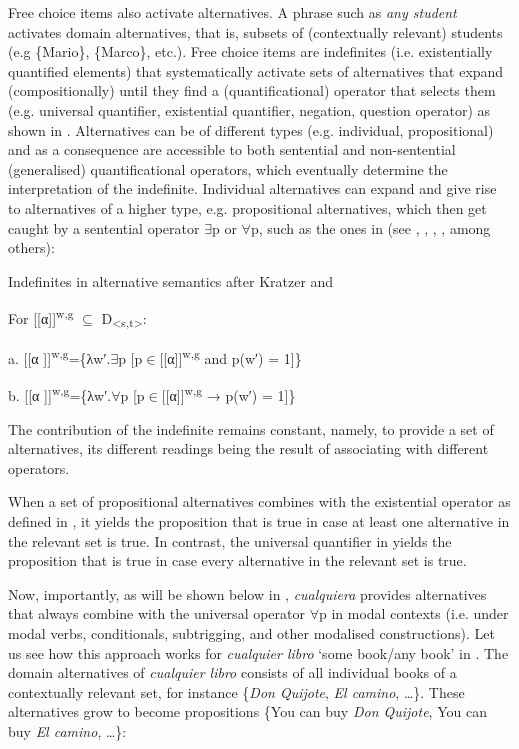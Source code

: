 \documentclass[output=paper]{langscibook}
\begin{document}
  Free choice items also activate alternatives. A phrase such as \textit{any student} activates domain alternatives, that is, subsets of (contextually relevant) students (e.g \{Mario\}, \{Marco\}, etc.). Free choice items are indefinites (i.e. existentially quantified elements) that systematically activate sets of alternatives that expand (compositionally) until they find a (quantificational) operator that selects them (e.g. universal quantifier, existential quantifier, negation, question operator) as shown in . Alternatives can be of different types (e.g. individual, propositional) and as a consequence are accessible to both sentential and non-sentential (generalised) quantificational operators, which eventually determine the interpretation of the indefinite. Individual alternatives can expand and give rise to alternatives of a higher type, e.g. propositional alternatives, which then get caught by a sentential operator ${\exists}$p or ${\forall}$p, such as the ones in  (see \citealt{KratzerShimoyama2002}, \citealt{Chierchia2006}, \citealt{Aloni2007}, \citealt{Alonso-OvalleMenéndez-Benito2011}, among others):

\label{bkm:Ref533761448}  Indefinites in alternative semantics after Kratzer and \citet[8]{Shimoyama2002}

  For [[α]]\textsuperscript{w,g} ${\subseteq}$ D\textsubscript{<s,t>}:

  a.  [[α ]]\textsuperscript{w,g}=\{λw′.${\exists}$p [p${\in}$[[α]]\textsuperscript{w,g} and p(w′) = 1]\}

  b.  [[α ]]\textsuperscript{w,g}=\{λw′.${\forall}$p [p${\in}$[[α]]\textsuperscript{w,g} → p(w′) = 1]\}

The contribution of the indefinite remains constant, namely, to provide a set of alternatives, its different readings being the result of associating with different operators.

  When a set of propositional alternatives combines with the existential operator as defined in , it yields the proposition that is true in case at least one alternative in the relevant set is true. In contrast, the universal quantifier in  yields the proposition that is true in case every alternative in the relevant set is true. 

  Now, importantly, as will be shown below in , \textit{cualquiera} provides alternatives that always combine with the universal operator ${\forall}$p in modal contexts (i.e. under modal verbs, conditionals, subtrigging, and other modalised constructions). Let us see how this approach works for \textit{cualquier libro} ‘some book/any book’ in . The domain alternatives of \textit{cualquier libro} consists of all individual books of a contextually relevant set, for instance \{\textit{Don Quijote}, \textit{El camino}, …\}. These alternatives grow to become propositions \{You can buy \textit{Don Quijote}, You can buy \textit{El camino}, …\}:
\end{document}
